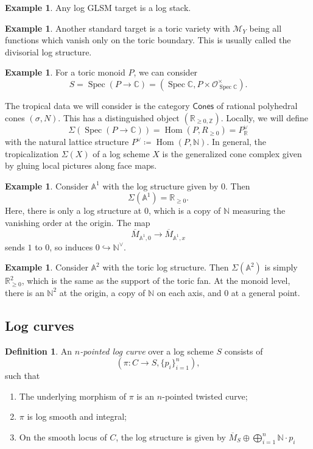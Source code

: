 \documentclass[10pt,oldfontcommands,oneside]{memoir}
\theoremstyle{definition}
\newtheorem{defn}[thm]{Definition}
\newtheorem{exm}[thm]{Example}
\theoremstyle{remark}
\theoremstyle{plain}
\theoremstyle{definition}
\theoremstyle{remark}
\newcommand{\A}{\mathbb{A}}
\newcommand{\N}{\mathbb{N}}
\newcommand{\R}{\mathbb{R}}
\newcommand{\C}{\mathbb{C}}
\newcommand{\Z}{\mathbb{Z}}
\newcommand{\mc}[1]{\mathcal{#1}}
\newcommand{\ms}[1]{\mathsf{#1}}
\newcommand{\ol}[1]{\overline{#1}}
\newcommand{\1}{\mathbf{1}}
\newcommand{\2}{\mathbf{2}}
\newcommand{\3}{\mathbf{3}}
\DeclareMathOperator{\Hom}{Hom}
\DeclareMathOperator{\Spec}{Spec}
\begin{document}
\begin{exm}
    Any log GLSM target is a log stack.
\end{exm}

\begin{exm}
    Another standard target is a toric variety with $\mc{M}_Y$ being all functions which vanish only on the toric boundary. This is usually called the divisorial log structure.
\end{exm}

\begin{exm}
    For a toric monoid $P$, we can consider
    \[ S = \Spec(P \to \C) = (\Spec \C, P \times \mc{O}_{\Spec \C}^{\times}). \]
\end{exm}

The tropical data we will consider is the category $\ms{Cones}$ of rational polyhedral cones $(\sigma, N)$. This has a distinguished object $(\R_{\geq 0, \Z})$. Locally, we will define
\[ \Sigma(\Spec (P \to \C)) = \Hom(P, R_{\geq 0}) = P_{\R}^{\vee} \]
with the natural lattice structure $P^{\vee} \coloneqq \Hom(P, \N)$. In general, the tropicalization $\Sigma(X)$ of a log scheme $X$ is the generalized cone complex given by gluing local pictures along face maps.

\begin{exm}
    Consider $\A^1$ with the log structure given by $0$. Then
    \[ \Sigma(\A^1) = \R_{\geq 0}. \]
    Here, there is only a log structure at $0$, which is a copy of $\N$ measuring the vanishing order at the origin. The map
    \[ \ol{M}_{\A^1, 0} \to \ol{M}_{\A^1, x} \]
    sends $1$ to $0$, so induces $0 \hookrightarrow \N^{\vee}$.
\end{exm}

\begin{exm}
    Consider $\A^2$ with the toric log structure. Then $\Sigma(\A^2)$ is simply $\R_{\geq 0}^2$, which is the same as the support of the toric fan. At the monoid level, there is an $\N^2$ at the origin, a copy of $\N$ on each axis, and $0$ at a general point.
\end{exm}

\subsection{Log curves}%
\label{sub:Log curves}

\begin{defn}
    An \textit{$n$-pointed log curve} over a log scheme $S$ consists of
    \[ (\pi \colon C \to S, \{p_i\}_{i=1}^n ), \]
    such that
    \begin{enumerate}
        \item The underlying morphism of $\pi$ is an $n$-pointed twisted curve;
        \item $\pi$ is log smooth and integral;
        \item On the smooth locus of $C$, the log structure is given by $\ol{M}_S \oplus \bigoplus_{i=1}^n \N \cdot p_i$
    \end{enumerate}
\end{defn}
\end{document}
